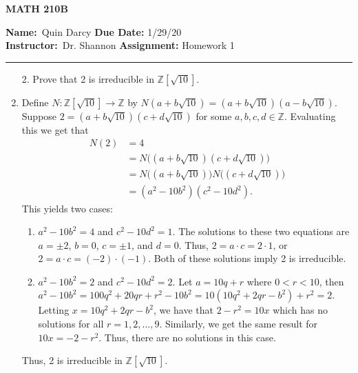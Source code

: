 \documentclass[12pt]{article}
\makeatletter
\theoremstyle{definition}
\theoremstyle{remark}
\renewenvironment{proof}[1][\proofname]{\par
  \pushQED{\qed}%
  \normalfont \topsep6\p@\@plus6\p@\relax
  \list{}{\leftmargin=0mm
          \rightmargin=4mm
          \settowidth{\itemindent}{\itshape#1}%
          \labelwidth=\itemindent
          \parsep=0pt \listparindent=\parindent 
  }
  \item[\hskip\labelsep
        \itshape
    #1\@addpunct{.}]\ignorespaces
}{%
  \popQED\endlist\@endpefalse
}
\let\oldproofname=\proofname
\renewcommand{\proofname}{\bf{\textit{\oldproofname}}}
\makeatother
\begin{document}
\thispagestyle{empty}\hline

\begin{center}
	\vspace{.4cm} {\textbf { \large MATH 210B}}
\end{center}
{\textbf{Name:}\ Quin Darcy \hspace{\fill} \textbf{Due Date:} 1/29/20   \\
{ \textbf{Instructor:}}\ Dr. Shannon \hspace{\fill} \textbf{Assignment:} Homework 1 \\ \hrule}

\justifying

    \begin{enumerate}[leftmargin=*]
        \item[2.] Prove that 2 is irreducible in $\mathbb{Z}[\sqrt{10}]$.
            \begin{proof}
                Define $N\colon\mathbb{Z}[\sqrt{10}]\rightarrow\mathbb{Z}$ by $N(a+b\sqrt{10})=(a+b\sqrt{10})(a-b\sqrt{10})$. Suppose $2=(a+b\sqrt{10})(c+d\sqrt{10})$ for some $a,b,c,d\in\mathbb{Z}$. Evaluating this we get that
                    \begin{equation*}
                        \begin{split}
                            N(2) &= 4 \\
                            &= N\big((a+b\sqrt{10})(c+d\sqrt{10})\big) \\
                            &=N\big((a+b\sqrt{10})\big)N\big((c+d\sqrt{10})\big) \\
                            &=(a^2-10b^2)(c^2-10d^2).
                        \end{split}
                    \end{equation*}
                This yields two cases:\vspace{2mm}
                    \begin{enumerate}[label=(\roman*)]
                        \item $a^2-10b^2=4$ and $c^2-10d^2=1$. The solutions to these two equations are $a=\pm 2$, $b=0$, $c=\pm 1$, and $d=0$. Thus, $2=a\cdot c=2\cdot 1$, or $2=a\cdot c=(-2)\cdot(-1)$. Both of these solutions imply 2 is irreducible. 
                        
                        \item $a^2-10b^2=2$ and $c^2-10d^2=2$. Let $a=10q+r$ where $0<r<10$, then $a^2-10b^2=100q^2+20qr+r^2-10b^2=10(10q^2+2qr-b^2)+r^2=2$. Letting $x=10q^2+2qr-b^2$, we have that $2-r^2=10x$ which has no solutions for all $r=1,2,\dots,9$. Similarly, we get the same result for $10x=-2-r^2$. Thus, there are no solutions in this case.
                    \end{enumerate}
                    \vspace{2mm}   
                Thus, 2 is irreducible in $\mathbb{Z}[\sqrt{10}]$.
            \end{proof}
            

\end{enumerate}
\end{document}
